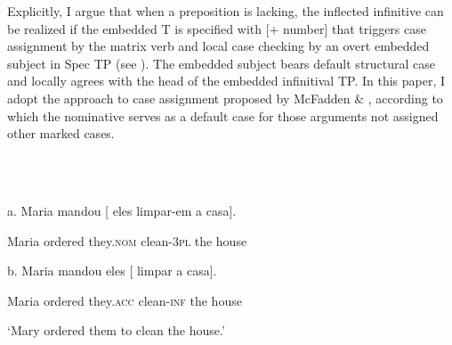 \documentclass[output=paper]{langsci/langscibook}
\begin{document}
  Explicitly, I argue that when a preposition is lacking, the inflected infinitive can be realized if the embedded T is specified with [+ number] that triggers case assignment by the matrix verb and local case checking by an overt embedded subject in Spec TP (see \citealt{Raposo1987}). The embedded subject bears default structural case and locally agrees with the head of the embedded infinitival TP. In this paper, I adopt the approach to case assignment proposed by McFadden \& \citet{Sundaresan2011}, according to which the nominative serves as a default case for those arguments not assigned other marked cases.

\ea%
    \label{ex:key:28}
    \gll\\
        \\
    \glt
    \z

           a.  Maria mandou [ eles          limpar-em   a     casa].    

    Maria ordered   they.\textsc{nom}   clean-\textsc{3pl}     the house

b.  Maria mandou   eles [  limpar      a    casa].

    Maria ordered   they.\textsc{acc}   clean-\textsc{inf} the house

    ‘Mary ordered them to clean the house.’
\end{document}
